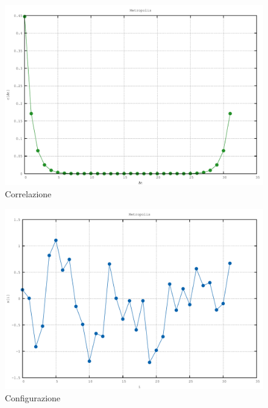 \begin{figure}[H]
\centering
\includegraphics[width=\textwidth]{correlation}
\caption{Correlazione}
\label{fig:correlation}
\end{figure}

\begin{figure}[H]
\centering
\includegraphics[width=\textwidth]{configuration}
\caption{Configurazione}
\label{fig:configuration}
\end{figure}

